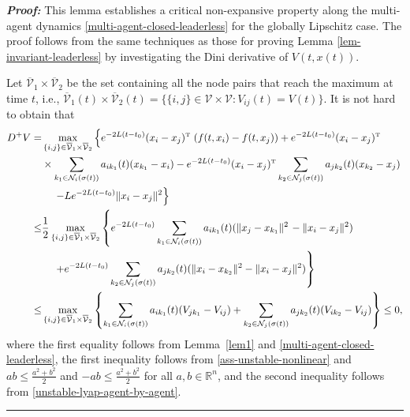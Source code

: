 \documentclass[a4paper, 11pt]{article}
\newcommand{\T}{^{\mbox{\tiny T}}}
\newenvironment{IEEEproof}[1][\bf Proof]{\smallskip\par\noindent\textit{#1: }}{\hspace*{\fill} \rule{6pt}{6pt}\smallskip}
\def\R{\mathbb{R}}
\begin{document}
\begin{IEEEproof}
This lemma establishes a critical non-expansive property along the multi-agent dynamics \eqref{multi-agent-closed-leaderless} for the globally Lipschitz case.
The proof follows from the same techniques as those for proving Lemma \ref{lem-invariant-leaderless} by investigating the Dini derivative of $V(t,x(t))$. 

Let $\overline{\mathcal{V}}_1\times\overline{\mathcal{V}}_2$ be the set containing all the node pairs that reach the maximum at time $t$, i.e.,
$\overline{\mathcal{V}}_1(t)\times\overline{\mathcal{V}}_2(t)=\{\{i,j\}\in\mathcal{V}\times\mathcal{V}: V_{ij}(t)=V(t)\}$.
It is not hard to obtain that
\begin{align}
D^+V \nonumber=& \max_{\{i,j\}\in\overline{\mathcal{V}}_1\times\overline{\mathcal{V}}_2}
\left\{e^{-2L(t-t_0)}(x_i-x_j)\T\right.
(f(t,x_i)-f(t,x_j))+e^{-2L(t-t_0)}(x_i-x_j)\T \nonumber \\
& \times \sum_{k_1 \in\mathcal{N}_i(\sigma(t))}a_{ik_1}(t)(x_{k_1}-x_i)-e^{-2L(t-t_0)}(x_i-x_j)\T\sum_{k_2 \in\mathcal{N}_j(\sigma(t))}a_{jk_2}(t)(x_{k_2}-x_j)\nonumber\\
& \hspace{0.4cm} \left.-Le^{-2L(t-t_0)}\|x_i-x_j\|^2\right\}\nonumber\\
\leq & \frac{1}{2}\max_{\{i,j\}\in\overline{\mathcal{V}}_1\times\overline{\mathcal{V}}_2}\left\{e^{-2L(t-t_0)} \sum_{k_1 \in\mathcal{N}_i(\sigma(t))}a_{ik_1}(t)(\|x_j-x_{k_1}\|^2 \right.-\|x_i-x_j\|^2)\nonumber \\
& \hspace{0.4cm} \left. +e^{-2L(t-t_0)} \sum_{k_2 \in\mathcal{N}_j(\sigma(t))}a_{jk_2}(t)   (\|x_i-x_{k_2}\|^2-\|x_i-x_j\|^2)\right\}\nonumber\\
\leq & \max_{\{i,j\}\in\overline{\mathcal{V}}_1\times\overline{\mathcal{V}}_2}
\left\{\sum_{k_1\in\mathcal{N}_i(\sigma(t))}a_{ik_1}(t)(V_{jk_1}-V_{ij})+\sum_{k_2 \in\mathcal{N}_j(\sigma(t))}a_{jk_2}(t)
(V_{ik_2}-V_{ij})\right\} \leq 0,\label{unstable-invariant}
\end{align}
where the first equality follows from Lemma~\ref{lem1} and \eqref{multi-agent-closed-leaderless},
the first inequality follows from  \eqref{ass-unstable-nonlinear} and $ab\leq \frac{a^2+b^2}{2}$ and $-ab\leq \frac{a^2+b^2}{2}$ for all $a, b \in \R^n$, and the second inequality follows from \eqref{unstable-lyap-agent-by-agent}.
\end{IEEEproof}
\end{document}

